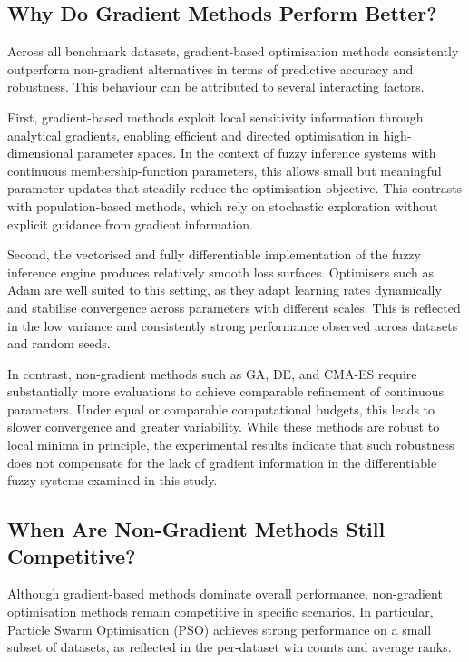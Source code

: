 \documentclass[a4paper,12pt,oneside]{article}
\begin{document}
\subsection{Why Do Gradient Methods Perform Better?}

Across all benchmark datasets, gradient-based optimisation methods consistently outperform non-gradient alternatives in terms of predictive accuracy and robustness. This behaviour can be attributed to several interacting factors.

First, gradient-based methods exploit local sensitivity information through analytical gradients, enabling efficient and directed optimisation in high-dimensional parameter spaces. In the context of fuzzy inference systems with continuous membership-function parameters, this allows small but meaningful parameter updates that steadily reduce the optimisation objective. This contrasts with population-based methods, which rely on stochastic exploration without explicit guidance from gradient information.

Second, the vectorised and fully differentiable implementation of the fuzzy inference engine produces relatively smooth loss surfaces. Optimisers such as Adam are well suited to this setting, as they adapt learning rates dynamically and stabilise convergence across parameters with different scales. This is reflected in the low variance and consistently strong performance observed across datasets and random seeds.

In contrast, non-gradient methods such as GA, DE, and CMA-ES require substantially more evaluations to achieve comparable refinement of continuous parameters. Under equal or comparable computational budgets, this leads to slower convergence and greater variability. While these methods are robust to local minima in principle, the experimental results indicate that such robustness does not compensate for the lack of gradient information in the differentiable fuzzy systems examined in this study.

\subsection{When Are Non-Gradient Methods Still Competitive?}

Although gradient-based methods dominate overall performance, non-gradient optimisation methods remain competitive in specific scenarios. In particular, Particle Swarm Optimisation (PSO) achieves strong performance on a small subset of datasets, as reflected in the per-dataset win counts and average ranks.
\end{document}
